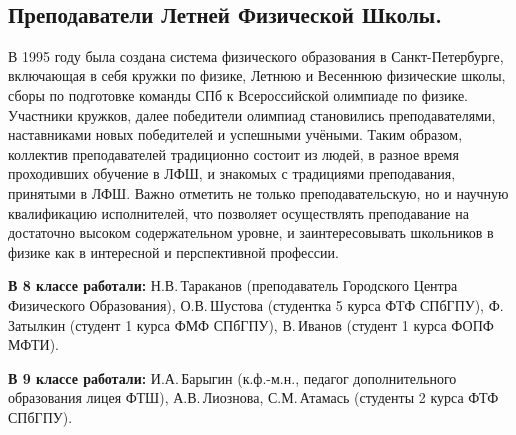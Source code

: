 \documentclass[12pt,a4paper,oneside]{scrartcl}
\newlength{\h}
\newlength{\x}
\begin{document}





\begin{figure}[h]
  \centering
  \hspace{0.05\textwidth}
  \\
\end{figure}


\subsection{Преподаватели Летней Физической Школы. }
\label{sec:teachers}

В 1995 году была создана система физического образования в
Санкт-Петербурге, включающая в себя кружки по физике, Летнюю и
Весеннюю физические школы, сборы по подготовке команды СПб к
Всероссийской олимпиаде по физике. Участники кружков, далее победители
олимпиад становились преподавателями, наставниками новых победителей и
успешными учёными. Таким образом, коллектив преподавателей традиционно
состоит из людей, в разное время проходивших обучение в ЛФШ, и
знакомых с традициями преподавания, принятыми в ЛФШ. Важно отметить не
только преподавательскую, но и научную квалификацию исполнителей, что
позволяет осуществлять преподавание на достаточно высоком
содержательном уровне, и заинтересовывать школьников в физике как в
интересной и перспективной профессии.

\textbf{В 8 классе работали:} Н.В.\,Тараканов (преподаватель Городского Центра
Физического Образования), О.В.\,Шустова (студентка 5 курса ФТФ СПбГПУ),
Ф.\,Затылкин (студент 1 курса ФМФ СПбГПУ), В.\,Иванов (студент 1 курса
ФОПФ МФТИ).

\begin{figure}[h]
  \centering
  \hspace{0.4cm}
  \hspace{0.4cm}
  \hspace{0.4cm}
\end{figure}

\textbf{В 9 классе работали:} И.А.\,Барыгин (к.ф.-м.н., педагог дополнительного
образования лицея ФТШ), А.В.\,Лиознова, С.М.\,Атамась (студенты 2 курса
ФТФ СПбГПУ).
\end{document}
